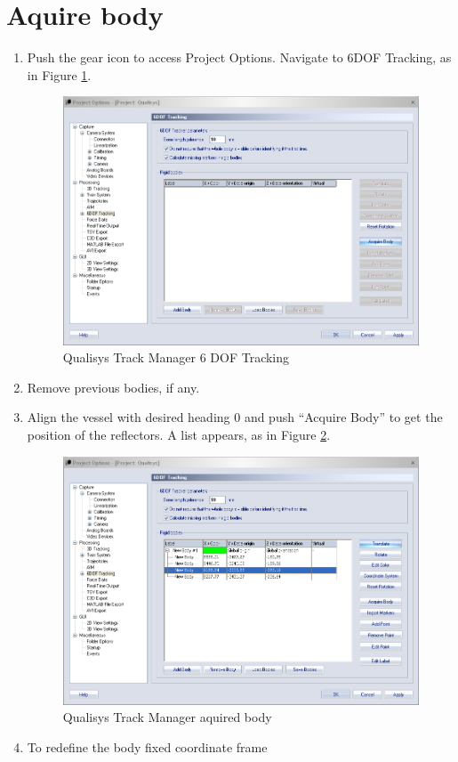 \documentclass[a4paper,twoside,english]{report}
\begin{document}
\section{Aquire body}
\begin{enumerate}
\item Push the gear icon to access Project Options. Navigate to 6DOF Tracking,
as in Figure \ref{fig:Qualisys-Track-Manager6DOF}.
\begin{figure}[!h]
\centering \includegraphics[width=1\textwidth]{fig/qualisys_6dof} \caption{\label{fig:Qualisys-Track-Manager6DOF}Qualisys Track Manager 6 DOF
Tracking}
\end{figure}
\item Remove previous bodies, if any.
\item Align the vessel with desired heading 0 and push ``Acquire Body''
to get the position of the reflectors. A list appears, as in Figure
\ref{fig:Qualisys-Track-ManagerAquiredBody}. 
\begin{figure}[!h]
\centering \includegraphics[width=1\textwidth]{fig/qualisys_orientating}
\caption{\label{fig:Qualisys-Track-ManagerAquiredBody}Qualisys Track Manager
aquired body}
\end{figure}
\item To redefine the body fixed coordinate frame 


\end{enumerate}
\end{document}
